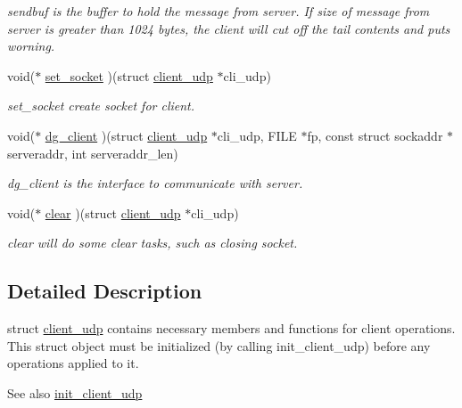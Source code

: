 \begin{DoxyCompactItemize}
\begin{DoxyCompactList}\small\item\em sendbuf is the buffer to hold the message from server. If size of message from server is greater than 1024 bytes, the client will cut off the tail contents and puts worning. \end{DoxyCompactList}\item 
void($\ast$ \hyperlink{structclient__udp_a0d82b47c5b21433d64dbcf02e0e2db35}{set\+\_\+socket} )(struct \hyperlink{structclient__udp}{client\+\_\+udp} $\ast$cli\+\_\+udp)
\begin{DoxyCompactList}\small\item\em set\+\_\+socket create socket for client. \end{DoxyCompactList}\item 
void($\ast$ \hyperlink{structclient__udp_a6b17261cd7cd4b8ee4c5de5604f7140c}{dg\+\_\+client} )(struct \hyperlink{structclient__udp}{client\+\_\+udp} $\ast$cli\+\_\+udp, F\+I\+L\+E $\ast$fp, const struct sockaddr $\ast$serveraddr, int serveraddr\+\_\+len)
\begin{DoxyCompactList}\small\item\em dg\+\_\+client is the interface to communicate with server. \end{DoxyCompactList}\item 
void($\ast$ \hyperlink{structclient__udp_ada50e2526e4b1f94aea1296655bd8f0d}{clear} )(struct \hyperlink{structclient__udp}{client\+\_\+udp} $\ast$cli\+\_\+udp)
\begin{DoxyCompactList}\small\item\em clear will do some clear tasks, such as closing socket. \end{DoxyCompactList}\end{DoxyCompactItemize}


\subsection{Detailed Description}
struct \hyperlink{structclient__udp}{client\+\_\+udp} contains necessary members and functions for client operations. This struct object must be initialized (by calling init\+\_\+client\+\_\+udp) before any operations applied to it. 

\begin{DoxySeeAlso}{See also}
\hyperlink{client__udp_8h_a634ec1ea0f7527823a71d4c6a445425e}{init\+\_\+client\+\_\+udp} 
\end{DoxySeeAlso}


